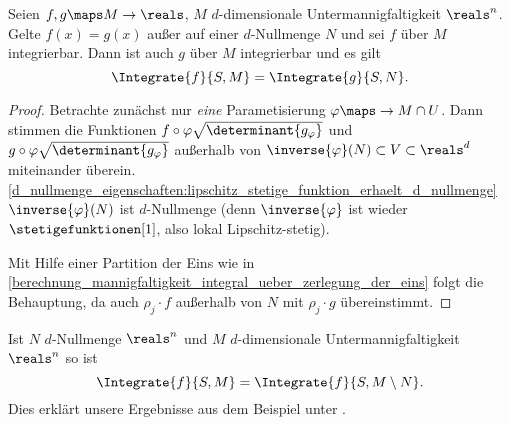 \begin{satz}
  Seien \( f,g\maps M\to \reals \), \( M \) \( d \)-dimensionale Untermannigfaltigkeit \tsubset \( \reals^n \). Gelte \( f(x)=g(x) \) außer auf einer \( d \)-Nullmenge \( N \) und sei \( f \) über \( M \) integrierbar. Dann ist auch \( g \) über \( M \) integrierbar und es gilt
  \begin{equation*}
    \Integrate{f}{S,M}=\Integrate{g}{S,N}.
  \end{equation*}
\end{satz}
\begin{proof}
  Betrachte zunächst nur \emph{eine} Parametisierung \( \varphi\maps \to M\cap U \). Dann stimmen die Funktionen \( f\circ \varphi \sqrt{\determinant{g_{\varphi}}}  \) und \( g\circ \varphi\sqrt{\determinant{g_{\varphi}}} \) außerhalb von \( \inverse{\varphi}(N)\subset V\subset \reals^d \) miteinander überein. \ref{d_nullmenge_eigenschaften:lipschitz_stetige_funktion_erhaelt_d_nullmenge} \timplies \( \inverse{\varphi}(N) \) ist \( d \)-Nullmenge (denn \( \inverse{\varphi} \)  ist wieder \( \stetigefunktionen[1] \), also lokal Lipschitz-stetig).
  
  Mit Hilfe einer Partition der Eins wie in \ref{berechnung_mannigfaltigkeit_integral_ueber_zerlegung_der_eins} folgt die Behauptung, da auch \( \rho_j\cdot f \) außerhalb von \( N \) mit \( \rho_j\cdot g \)
  übereinstimmt.
\end{proof}
\begin{folgerung*}
  Ist \( N \) \( d \)-Nullmenge \tsubset \( \reals^n \) und \( M \) \( d \)-dimensionale Untermannigfaltigkeit \tsubset \( \reals^n \) so ist
  \begin{equation*}
    \Integrate{f}{S,M}=\Integrate{f}{S,M\setminus N}.
  \end{equation*}
  Dies erklärt unsere Ergebnisse aus dem Beispiel unter .
\end{folgerung*}
